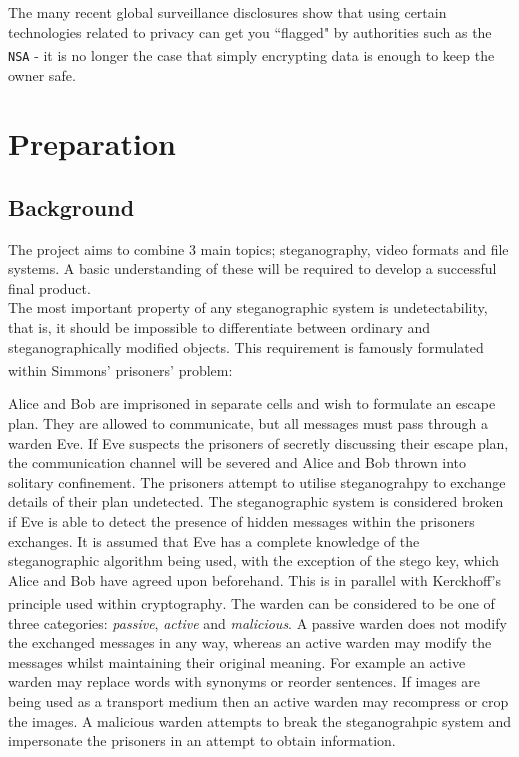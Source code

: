 \documentclass[paper=a4, fontsize=11pt,twoside]{scrartcl}
\numberwithin{table}{section}
\numberwithin{figure}{section}
\numberwithin{algorithm}{section}
\begin{document}
The many recent global surveillance disclosures show that using certain technologies related to privacy can get you ``flagged" by authorities such as the \texttt{NSA}\textsuperscript{\cite{nsa}} - it is no longer the case that simply encrypting data is enough to keep the owner safe.


\section{Preparation}
\subsection{Background}
The project aims to combine 3 main topics; steganography, video formats and file systems. A basic understanding of these will be required to develop a successful final product.\\

\noindent
The most important property of any steganographic system is undetectability, that is, it should be impossible to differentiate between ordinary and steganographically modified objects. This requirement is famously formulated within Simmons' prisoners' problem\textsuperscript{\cite{prisoner}}:

Alice and Bob are imprisoned in separate cells and wish to formulate an escape plan. They are allowed to communicate, but all messages must pass through a warden Eve. If Eve suspects the prisoners of secretly discussing their escape plan, the communication channel will be severed and Alice and Bob thrown into solitary confinement. The prisoners attempt to utilise steganograhpy to exchange details of their plan undetected. The steganographic system is considered broken if Eve is able to detect the presence of hidden messages within the prisoners exchanges. It is assumed that Eve has a complete knowledge of the steganographic algorithm being used, with the exception of the stego key, which Alice and Bob have agreed upon beforehand. This is in parallel with Kerckhoff's principle used within cryptography\textsuperscript{\cite{kirc}}. The warden can be considered to be one of three categories: \textit{passive}, \textit{active} and \textit{malicious}. A passive warden does not modify the exchanged messages in any way, whereas an active warden may modify the messages whilst maintaining their original meaning. For example an active warden may replace words with synonyms or reorder sentences. If images are being used as a transport medium then an active warden may recompress or crop the images. A malicious warden attempts to break the steganograhpic system and impersonate the prisoners in an attempt to obtain information.
\end{document}
